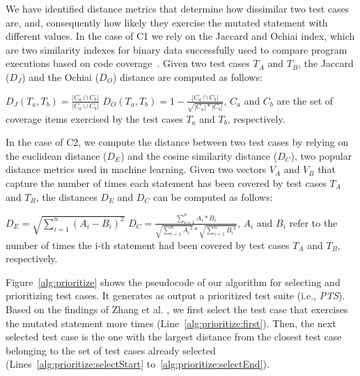 We have identified distance metrics that determine how dissimilar two test cases are, and, consequently how likely they exercise the mutated statement with different values. In the case of C1 we rely on the Jaccard and Ochiai index, which are two similarity indexes for binary data successfully used to compare program executions based on code coverage~\cite{Zou:Ochiai:2019,Keller:Jaccard:2017,Briand:2019}. Given two test cases $T_A$ and $T_B$, the Jaccard  ($D_J$) and the Ochiai ($D_O$) distance are computed as follows:

$D_J(T_a,T_b)=\frac{|C_a \cap C_b|}{|C_a \cup C_b|}$ \hspace{5mm} $D_O(T_a,T_b)=1-\frac{|C_a \cap C_b|}{\sqrt{|C_a| * |C_b|}}$, 
$C_a$ and $C_b$ are the set of coverage items exercised by the test cases $T_a$ and $T_b$, respectively.

In the case of C2, we compute the distance between two test cases by relying on the euclidean distance ($D_E$) and the cosine similarity distance ($D_C$), two popular distance metrics used in machine learning. Given two vectors $V_A$ and $V_B$ that capture the number of times each statement has been covered by test cases $T_A$ and $T_B$, the distances $D_E$ and $D_C$ can be computed as follows:

$D_E=\sqrt{\sum_{i=1}^{n}(A_i-B_i)^2}$ 
$D_C= \frac{\sum_{i=1}^{n}A_i*B_i}{\sqrt{\sum_{i=1}^{n}{A_i}^2}*\sqrt{\sum_{i=1}^{n}{B_i}^2}}$,
$A_i$ and $B_i$ refer to the number of times the i-th statement had been covered by test cases $T_A$ and $T_B$, respectively.

Figure~\ref{alg:prioritize} shows the pseudocode of our algorithm for selecting and prioritizing test cases. It generates as output
a prioritized test suite (i.e., \emph{PTS}).
Based on the findings of Zhang et al. \cite{zhang2013faster}, we first select the test case that exercises the mutated statement more times (Line~\ref{alg:prioritize:first}).
Then, the next selected test case is the one with the largest distance from the closest test case belonging to the set of test cases already selected (Lines~\ref{alg:prioritize:selectStart} to~\ref{alg:prioritize:selectEnd}). 


